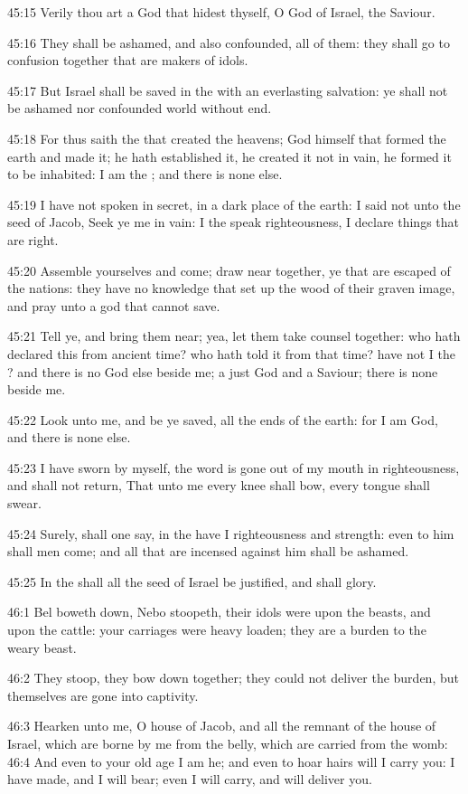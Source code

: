 45:15 Verily thou art a God that hidest thyself, O God of Israel, the
Saviour.

45:16 They shall be ashamed, and also confounded, all of them: they
shall go to confusion together that are makers of idols.

45:17 But Israel shall be saved in the \LORD with an everlasting
salvation: ye shall not be ashamed nor confounded world without end.

45:18 For thus saith the \LORD that created the heavens; God himself
that formed the earth and made it; he hath established it, he created
it not in vain, he formed it to be inhabited: I am the \LORD; and there
is none else.

45:19 I have not spoken in secret, in a dark place of the earth: I
said not unto the seed of Jacob, Seek ye me in vain: I the \LORD speak
righteousness, I declare things that are right.

45:20 Assemble yourselves and come; draw near together, ye that are
escaped of the nations: they have no knowledge that set up the wood of
their graven image, and pray unto a god that cannot save.

45:21 Tell ye, and bring them near; yea, let them take counsel
together: who hath declared this from ancient time? who hath told it
from that time?  have not I the \LORD? and there is no God else beside
me; a just God and a Saviour; there is none beside me.

45:22 Look unto me, and be ye saved, all the ends of the earth: for I
am God, and there is none else.

45:23 I have sworn by myself, the word is gone out of my mouth in
righteousness, and shall not return, That unto me every knee shall
bow, every tongue shall swear.

45:24 Surely, shall one say, in the \LORD have I righteousness and
strength: even to him shall men come; and all that are incensed
against him shall be ashamed.

45:25 In the \LORD shall all the seed of Israel be justified, and shall
glory.

46:1 Bel boweth down, Nebo stoopeth, their idols were upon the beasts,
and upon the cattle: your carriages were heavy loaden; they are a
burden to the weary beast.

46:2 They stoop, they bow down together; they could not deliver the
burden, but themselves are gone into captivity.

46:3 Hearken unto me, O house of Jacob, and all the remnant of the
house of Israel, which are borne by me from the belly, which are
carried from the womb: 46:4 And even to your old age I am he; and even
to hoar hairs will I carry you: I have made, and I will bear; even I
will carry, and will deliver you.

